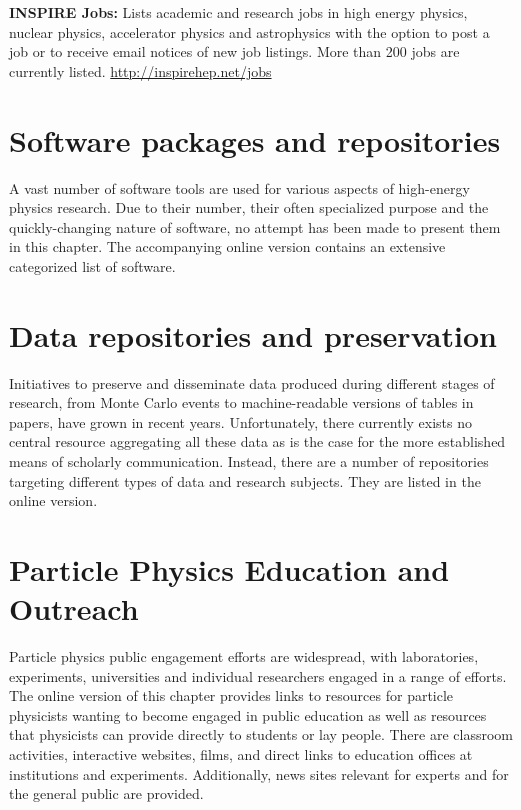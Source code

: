   \textbf{INSPIRE Jobs:} Lists academic and research jobs in high
  energy physics, nuclear physics, accelerator physics and astrophysics
  with the option to post a job or to receive email notices of new job
  listings. More than 200 jobs are currently listed.
  \url{http://inspirehep.net/jobs}

\section{Software packages and
repositories}\label{databases:sec:repositories}

A vast number of software tools are used for various aspects of high-energy
physics research. Due to their number, their often specialized purpose and the
quickly-changing nature of software, no attempt has been made to present them in this chapter.
The accompanying online version contains an extensive categorized list of software.

\section{Data repositories and preservation}\label{databases:sec:datarepositories}


Initiatives to preserve and disseminate data produced during different stages
of research, from Monte Carlo events to machine-readable versions of tables in
papers, have grown in recent years.  Unfortunately, there currently exists no
central resource aggregating all these data as is the case for the more
established means of scholarly communication. Instead, there are a number of
repositories targeting different types of data and research subjects. They are
listed in the online version.

\section{Particle Physics Education and Outreach
}\label{databases:sec:edusites}

Particle physics public engagement efforts are widespread, with laboratories, 
experiments, universities and individual researchers engaged in a range
of efforts. The online version of this chapter provides links to resources
for particle physicists wanting to become engaged in public education as 
well as resources that physicists can provide directly to students or lay
people. There are classroom activities, interactive websites, films, and
direct links to education offices at institutions and experiments. Additionally, 
news sites relevant for experts and for the general public are provided. 
